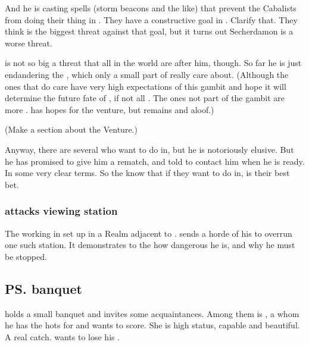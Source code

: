 And he is casting spells (storm beacons and the like) that prevent the Cabalists from doing their thing in \Malcur.
They have a constructive goal in \Malcur. 
Clarify that.
They think \Ishnaruchaefir is the biggest threat against that goal, but it turns out Secherdamon is a worse threat. 

\Ishnaruchaefir is not so big a threat that all \resphain in the world are after him, though.
So far he is just endandering the , which only a small part of \CiriathSepher really care about. 
(Although the ones that do care have very high expectations of this gambit and hope it will determine the future fate of \CiriathSepher, if not all \resphain. 
 The ones not part of the gambit are more \skeptical. 
 \Azraid has hopes for the venture, but remains \skeptical and aloof.)

(Make a section about the \CiriathSepher \Malcur Venture.)

Anyway, there are several \resphain who want to do \Ishnaruchaefir in, but he is notoriously elusive.
But he has promised \Teshrial to give him a rematch, and told \Teshrial to contact him when he is ready.
In some very clear terms.
So the \resphain know that if they want to do \Ishnaruchaefir in, \Teshrial is their best bet.





\subsubsection{\Ishnaruchaefir attacks viewing station}
The \resphain working in \Malcur {} set up in a Realm adjacent to \Azmith. 
\Ishnaruchaefir sends a horde of his \daemons to overrun one such station. 
It demonstrates to the \resphain how dangerous he is, and why he must be stopped.









\subsection{\ps{\Teshrial} banquet}
\Teshrial{} holds a small banquet and invites some \ketheran{} acquaintances. 
Among them is \Firaxel, a \resvil{} whom he has the hots for and wants to score. 
She is high status, capable and beautiful. 
A real catch. 
\Teshrial{} wants to lose his . 

